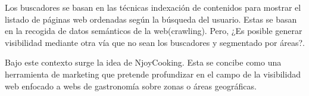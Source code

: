 \vspace{5 mm}

Los buscadores se basan en las técnicas indexación de contenidos para mostrar el listado de páginas web ordenadas según la búsqueda del usuario.
Estas se basan en la recogida de datos semánticos de la web(crawling). Pero, ¿Es posible generar visibilidad mediante otra vía que no sean los buscadores
y segmentado por áreas?.

\vspace{5 mm}

Bajo este contexto surge la idea de NjoyCooking. Esta se concibe como una herramienta de
marketing que pretende profundizar en el campo de la visibilidad web enfocado a webs de gastronomía sobre zonas o áreas geográficas.
